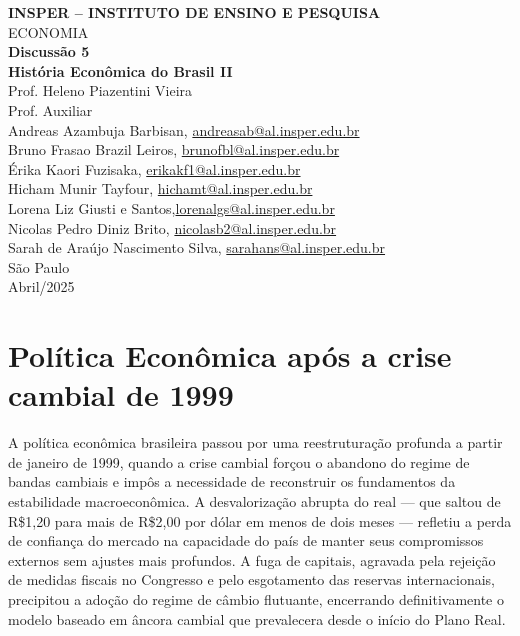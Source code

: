 \documentclass[a4paper,12pt]{article}[abntex2]
\begin{document}
\begin{titlepage}
    \centering
    \vspace*{1cm}
    \Large\textbf{INSPER – INSTITUTO DE ENSINO E PESQUISA}\\
    \Large ECONOMIA\\
    \vspace{1.5cm}
    \Large\textbf{Discussão 5}\\
    \textbf{História Econômica do Brasil II}\\
    \vspace{1.5cm}
    Prof. Heleno Piazentini Vieira \\
    Prof. Auxiliar  \\
    \vfill
    \normalsize
    Andreas Azambuja Barbisan, \href{mailto:andreasab@al.insper.edu.br}{andreasab@al.insper.edu.br}\\
    Bruno Frasao Brazil Leiros, \href{mailto:brunofbl@al.insper.edu.br}{brunofbl@al.insper.edu.br}\\
    Érika Kaori Fuzisaka, \href{mailto:erikakf1@al.insper.edu.br}{erikakf1@al.insper.edu.br}\\
    Hicham Munir Tayfour, \href{mailto:hichamt@al.insper.edu.br}{hichamt@al.insper.edu.br}\\
    Lorena Liz Giusti e Santos,\href{mailto:lorenalgs@al.insper.edu.br}{lorenalgs@al.insper.edu.br}\\
    Nicolas Pedro Diniz Brito, \href{mailto:nicolasb2@al.insper.edu.br}{nicolasb2@al.insper.edu.br}\\
    Sarah de Araújo Nascimento Silva, \href{mailto:sarahans@al.insper.edu.br}{sarahans@al.insper.edu.br}\\


    \vfill
    São Paulo\\
    Abril/2025
\end{titlepage}

\newpage
\tableofcontents
\thispagestyle{empty} %

\newpage
\setcounter{page}{1} %
\justify
\onehalfspacing

\section{\textbf{Política Econômica após a crise cambial de 1999}}

A política econômica brasileira passou por uma reestruturação profunda a partir de janeiro de 1999, quando a crise cambial forçou o abandono do regime de bandas cambiais e impôs a necessidade de reconstruir os fundamentos da estabilidade macroeconômica. A desvalorização abrupta do real — que saltou de R\$1,20 para mais de R\$2,00 por dólar em menos de dois meses — refletiu a perda de confiança do mercado na capacidade do país de manter seus compromissos externos sem ajustes mais profundos. A fuga de capitais, agravada pela rejeição de medidas fiscais no Congresso e pelo esgotamento das reservas internacionais, precipitou a adoção do regime de câmbio flutuante, encerrando definitivamente o modelo baseado em âncora cambial que prevalecera desde o início do Plano Real.
\end{document}
